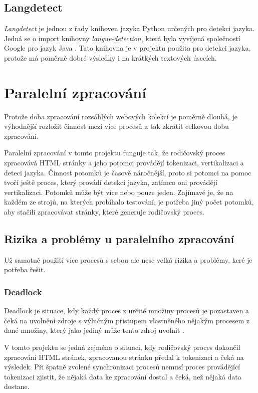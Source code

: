 \subsection{Langdetect}
\label{langdetect}
\textit{Langdetect} je jednou z řady knihoven jazyka Python určených pro detekci jazyka.
Jedná se o import knihovny \textit{langue-detection}, která byla vyvíjená společností Google
pro jazyk Java \cite{LANGDETECT}. Tato knihovna je v projektu použita pro detekci jazyka,
protože má poměrně dobré výsledky i na krátkých textových úsecích.

\section{Paralelní zpracování}
\label{paralel_tokenizer}
Protože doba zpracování rozsáhlých webových kolekcí je poměrně dlouhá, je výhodnější rozložit
činnost mezi více procesů a tak zkrátit celkovou dobu zpracování.

Paralelní zpracování v tomto projektu funguje tak, že rodičovský proces zpracovává HTML
stránky a jeho potomci provádějí tokenizaci, vertikalizaci a deteci jazyka.
Činnost potomků je časově náročnější, proto si potomci na pomoc tvoří ještě proces,
který provádí detekci jazyka, zatímco oni provádějí vertikalizaci.
Potomků může být více nebo pouze jeden. Zajímavé je, že na každém ze strojů, na kterých
probíhalo testování, je potřeba jiný počet potomků, aby stačili zpracovávat stránky, které
generuje rodičovský proces.

\subsection{Rizika a problémy u paralelního zpracování}
Už samotné použití více procesů s sebou ale nese velká rizika a problémy, keré je potřeba řešit.

\subsubsection{Deadlock}
\label{deadlock}
Deadlock je situace, kdy každý proces z určité množiny procesů je pozastaven a čeká na
uvolnění zdroje s výlučným přístupem vlastněného nějakým procesem z dané množiny, který
jako jediný může tento zdroj uvolnit \cite{SYNCPROCES}.

V tomto projektu se jedná zejména o situaci, kdy rodičovský proces dokončil zpracování HTML stránek,
zpracovanou stránku předal k tokenizaci a čeká na výsledek. Při špatně zvolené synchronizaci
procesů nemusí proces provádějící tokenizaci zjistit, že nějaká data ke zpracování dostal
a čeká, než nějaká data dostane.

